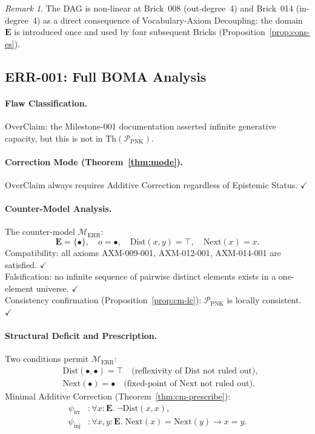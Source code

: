 \documentclass[12pt, a4paper]{article}
\theoremstyle{plain}
\theoremstyle{definition}
\theoremstyle{remark}
\newtheorem{remark}[theorem]{Remark}
\newcommand{\BOMA}{\textsf{BOMA}}
\newcommand{\Th}[1]{\mathrm{Th}(#1)}
\begin{document}
\begin{remark}
The DAG is non-linear at Brick~008 (out-degree~4) and Brick~014
(in-degree~4) as a direct consequence of Vocabulary-Axiom Decoupling:
the domain $\mathbf{E}$ is introduced once and used by four subsequent
Bricks (Proposition~\ref{prop:cons-es}).
\end{remark}

\subsection{ERR-001: Full \BOMA{} Analysis}
\label{subsec:ex-err}

\paragraph{Flaw Classification.}
$\mathrm{OverClaim}$: the Milestone-001 documentation asserted infinite
generative capacity, but this is not in
$\Th{\mathcal{P}_{\mathrm{PNK}}}$.

\paragraph{Correction Mode (Theorem~\ref{thm:mode}).}
$\mathrm{OverClaim}$ always requires Additive Correction regardless of
Epistemic Status. $\checkmark$

\paragraph{Counter-Model Analysis.}
The counter-model $\mathcal{M}_{\mathrm{ERR}}$:
\[
  \mathbf{E} = \{\bullet\},\quad
  o = \bullet,\quad
  \mathrm{Dist}(x,y) = \top,\quad
  \mathrm{Next}(x) = x.
\]
Compatibility: all axioms AXM-009-001, AXM-012-001, AXM-014-001
are satisfied. $\checkmark$\\
Falsification: no infinite sequence of pairwise distinct elements
exists in a one-element universe. $\checkmark$\\
Consistency confirmation (Proposition~\ref{prop:cm-lc}):
$\mathcal{P}_{\mathrm{PNK}}$ is locally consistent. $\checkmark$

\paragraph{Structural Deficit and Prescription.}
Two conditions permit $\mathcal{M}_{\mathrm{ERR}}$:
\begin{align*}
  &\mathrm{Dist}(\bullet,\bullet) = \top \quad
    \text{(reflexivity of Dist not ruled out)}, \\
  &\mathrm{Next}(\bullet) = \bullet \quad
    \text{(fixed-point of Next not ruled out)}.
\end{align*}
Minimal Additive Correction (Theorem~\ref{thm:cm-prescribe}):
\begin{align*}
  \psi_{\mathrm{irr}} &:
    \forall x : \mathbf{E}.\; \neg\mathrm{Dist}(x,x), \\
  \psi_{\mathrm{inj}} &:
    \forall x, y : \mathbf{E}.\;
    \mathrm{Next}(x) = \mathrm{Next}(y) \to x = y.
\end{align*}
\end{document}
